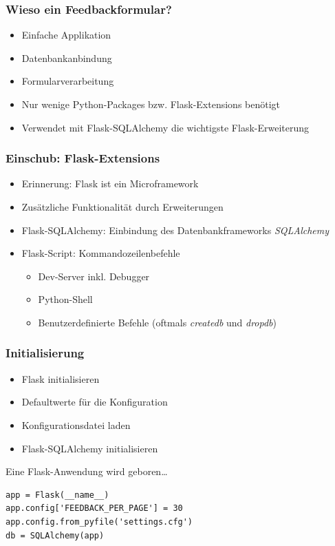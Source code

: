 \documentclass{beamer}
\begin{document}
\begin{frame}
  \frametitle{Wieso ein Feedbackformular?}
  \begin{itemize}
    \item Einfache Applikation
    \item Datenbankanbindung
    \item Formularverarbeitung
    \item Nur wenige Python-Packages bzw. Flask-Extensions benötigt
    \item Verwendet mit Flask-SQLAlchemy die wichtigste Flask-Erweiterung
  \end{itemize}
\end{frame}

\begin{frame}
  \frametitle{Einschub: Flask-Extensions}
  \begin{itemize}
    \item Erinnerung: Flask ist ein Microframework
    \item Zusätzliche Funktionalität durch Erweiterungen
    \item Flask-SQLAlchemy: Einbindung des Datenbankframeworks \emph{SQLAlchemy}
    \item Flask-Script: Kommandozeilenbefehle
    \begin{itemize}
      \item Dev-Server inkl. Debugger
      \item Python-Shell
      \item Benutzerdefinierte Befehle (oftmals \emph{createdb} und \emph{dropdb})
    \end{itemize}
  \end{itemize}
\end{frame}

\begin{frame}[fragile]
  \frametitle{Initialisierung}
  \begin{itemize}
    \item Flask initialisieren
    \item Defaultwerte für die Konfiguration
    \item Konfigurationsdatei laden
    \item Flask-SQLAlchemy initialisieren
  \end{itemize}
  \begin{exampleblock}{Eine Flask-Anwendung wird geboren\ldots}
    \begin{lstlisting}
app = Flask(__name__)
app.config['FEEDBACK_PER_PAGE'] = 30
app.config.from_pyfile('settings.cfg')
db = SQLAlchemy(app)
    \end{lstlisting}
  \end{exampleblock}
\end{frame}
\end{document}
